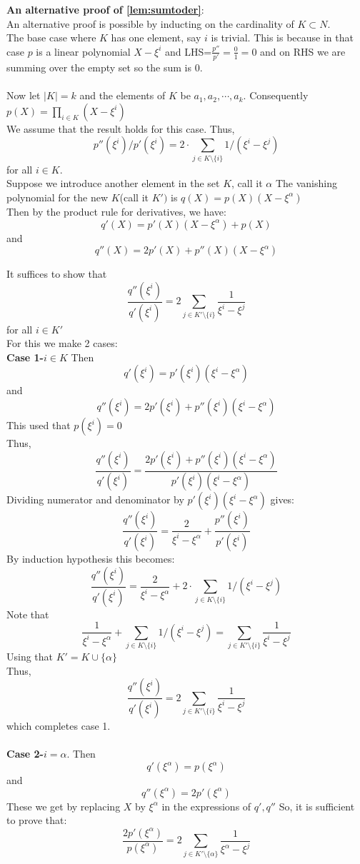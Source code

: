 \textbf{An alternative proof of \ref{lem:sumtoder}}:\\
An alternative proof is possible by inducting on the cardinality of $K\subset N$.\\
The base case where $K$ has one element, say $i$ is trivial. This is because in that case $p$ is a linear polynomial $X-\xi^i$ and LHS=$\frac{p''}{p'}=\frac{0}{1}=0$ and on RHS we are summing over the empty set so the sum is $0$.\\\\
Now let $|K|=k$ and the elements of $K$ be $a_1, a_2, \cdots, a_k$.
Consequently $p(X)=\prod_{i \in K}(X-\xi^i)$\\
We assume that the result holds for this case. Thus,
$$p''(\xi^i)/p'(\xi^i)=2 \cdot \sum_{j\in K\setminus \{i\}} 1/(\xi^i-\xi^j)$$ for all $i \in K$.\\
Suppose we introduce another element in the set $K$, call it $\alpha$
The vanishing polynomial for the new $K$(call it $K')$ is $q(X)=p(X)(X-\xi^{\alpha})$\\
Then by the product rule for derivatives, we have:
$$q'(X)=p'(X)(X-\xi^{\alpha})+p(X)$$ and
$$q''(X)=2p'(X)+p''(X)(X-\xi^{\alpha})$$

It suffices to show that $$\frac{q''(\xi^i)}{q'(\xi^i)}=2\sum_{j\in K'\setminus \{i\}}\frac{1}{\xi^i-\xi^j}$$
for all $i \in K'$\\
For this we make 2 cases:\\
\textbf{Case 1-}$i \in K$
Then
$$q'(\xi^i)=p'(\xi^i)(\xi^i-\xi^{\alpha})$$ and
$$q''(\xi^i)=2p'(\xi^i)+p''(\xi^i)(\xi^i-\xi^{\alpha})$$
This used that $p(\xi^i)=0$\\
Thus, $$\frac{q''(\xi^i)}{q'(\xi^i)}=\frac{2p'(\xi^i)+p''(\xi^i)(\xi^i-\xi^{\alpha})}{p'(\xi^i)(\xi^i-\xi^{\alpha})}$$
Dividing numerator and denominator by $p'(\xi^i)(\xi^i-\xi^{\alpha})$ gives:
$$\frac{q''(\xi^i)}{q'(\xi^i)}=\frac{2}{\xi^i-\xi^\alpha}+\frac{p''(\xi^i)}{p'(\xi^i)}$$
By induction hypothesis this becomes:
$$\frac{q''(\xi^i)}{q'(\xi^i)}=\frac{2}{\xi^i-\xi^\alpha}+2 \cdot \sum_{j\in K\setminus \{i\}} 1/(\xi^i-\xi^j)$$
Note that $$\frac{1}{\xi^i-\xi^\alpha}+ \sum_{j\in K\setminus \{i\}} 1/(\xi^i-\xi^j)=\sum_{j\in K'\setminus \{i\}}\frac{1}{\xi^i-\xi^j}$$
Using that $K'=K \cup \{\alpha\}$\\
Thus, $$\frac{q''(\xi^i)}{q'(\xi^i)}=2\sum_{j\in K'\setminus \{i\}}\frac{1}{\xi^i-\xi^j}$$ which completes case 1. \\\\
\textbf{Case 2-}$i=\alpha$. Then
$$q'(\xi^{\alpha})=p(\xi^{\alpha})$$ and
$$q''(\xi^{\alpha})=2p'(\xi^{\alpha})$$
These we get by replacing $X$ by $\xi^{\alpha}$ in the expressions of $q', q''$
So, it is sufficient to prove that:
$$\frac{2p'(\xi^{\alpha})}{p(\xi^{\alpha})}=2\sum_{j\in K'\setminus \{\alpha\}}\frac{1}{\xi^{\alpha}-\xi^j}$$

